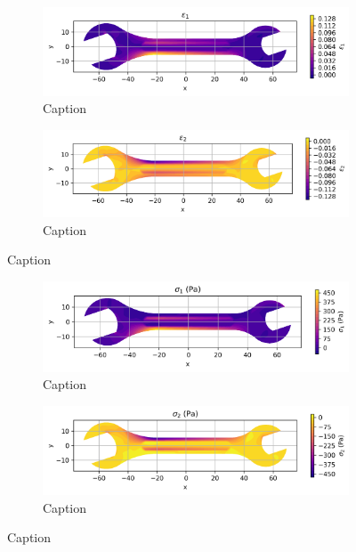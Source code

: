 \documentclass{article}  %
\begin{document}
\begin{figure}[H]
  \centering
  \begin{subfigure}[t]{0.49\textwidth}
    \centering
    \includegraphics[width=\textwidth]{GRAFICOS/Case a - epsilon_1.png}
    \caption{Caption}
    \label{fig:deformada_reacciones}
  \end{subfigure}
  \hfill
  \begin{subfigure}[t]{0.49\textwidth}
    \centering
    \includegraphics[width=\textwidth]{GRAFICOS/Case a - epsilon_2.png}
    \caption{Caption}
    \label{fig:von_mises}
  \end{subfigure}
  \caption{Caption}
  \label{fig:analisis_estructural}
\end{figure}

\begin{figure}[H]
  \centering
  \begin{subfigure}[t]{0.49\textwidth}
    \centering
    \includegraphics[width=\textwidth]{GRAFICOS/Case a - sigma_1.png}
    \caption{Caption}
    \label{fig:deformada_reacciones}
  \end{subfigure}
  \hfill
  \begin{subfigure}[t]{0.49\textwidth}
    \centering
    \includegraphics[width=\textwidth]{GRAFICOS/Case a - sigma_2.png}
    \caption{Caption}
    \label{fig:von_mises}
  \end{subfigure}
  \caption{Caption}
  \label{fig:analisis_estructural}
\end{figure}
\end{document}
